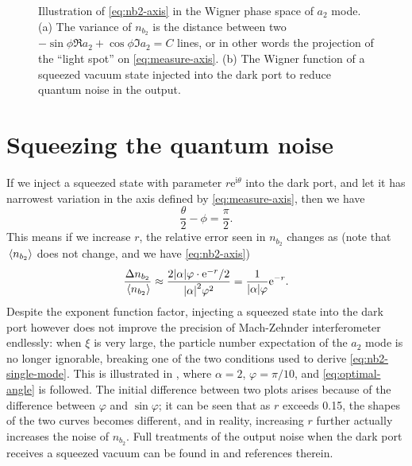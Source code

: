 \documentclass[hyperref, a4paper]{article}
\newcommand*{\ii}{\mathrm{i}}
\newcommand*{\ee}{\mathrm{e}}
\begin{document}
\begin{figure}
    \centering
    \begin{subfigure}{0.48\textwidth}
        \centering
        
        \subcaption{}
    \end{subfigure}
    \begin{subfigure}{0.48\textwidth}
        \centering
        
        \subcaption{}
    \end{subfigure}
    \caption{Illustration of \eqref{eq:nb2-axis} in the Wigner phase space of $a_2$ mode. 
    (a) The variance of $n_{b_2}$ is the distance 
    between two $-\sin \phi \Re a_2 + \cos \phi \Im a_2 = C$ lines,
    or in other words the projection of the ``light spot'' on \eqref{eq:measure-axis}.
    (b) The Wigner function of a squeezed vacuum state injected into the dark port 
    to reduce quantum noise in the output.
    }
    \label{fig:can-be-squeezed}
\end{figure}

\section{Squeezing the quantum noise}\label{sec:squeezing}

If we inject a squeezed state with parameter $r \ee^{\ii \theta}$ 
into the dark port,
and let it has narrowest variation in the axis defined by \eqref{eq:measure-axis}, 
then we have 
\begin{equation}
    \frac{\theta}{2} - \phi = \frac{\pi}{2}.
    \label{eq:optimal-angle}
\end{equation}
This means if we increase $r$, 
the relative error seen in $n_{b_2}$ changes as 
(note that $\expval*{n_{b_2}}$ does not change,
and we have \eqref{eq:nb2-axis})
\begin{equation}
    \frac{\Delta n_{b_2}}{\expval*{n_{b_2}}} 
    \approx \frac{2 \abs{\alpha} \varphi \cdot \ee^{-r} /2 }{\abs{\alpha}^2 \varphi^2} 
    = \frac{1}{\abs{\alpha} \varphi} \ee^{-r}.
    \label{eq:approx-squeezing}
\end{equation}
Despite the exponent function factor,
injecting a squeezed state into the dark port however does not improve 
the precision of Mach-Zehnder interferometer endlessly:
when $\xi$ is very large,
the particle number expectation of the $a_2$ mode is no longer ignorable,
breaking one of the two conditions used to derive \eqref{eq:nb2-single-mode}.
This is illustrated in ,
where $\alpha = 2$, $\varphi = \pi / 10$,
and \eqref{eq:optimal-angle} is followed.
The initial difference between two plots arises because of the difference between $\varphi$ and $\sin \varphi$;
it can be seen that as $r$ exceeds 0.15,
the shapes of the two curves becomes different,
and in reality, increasing $r$ further actually increases the noise of $n_{b_2}$.
Full treatments of the output noise when the dark port receives a squeezed vacuum
can be found in \cite{walls_quantum_2008,pezze_mach-zehnder_2008} and references therein.
\end{document}
